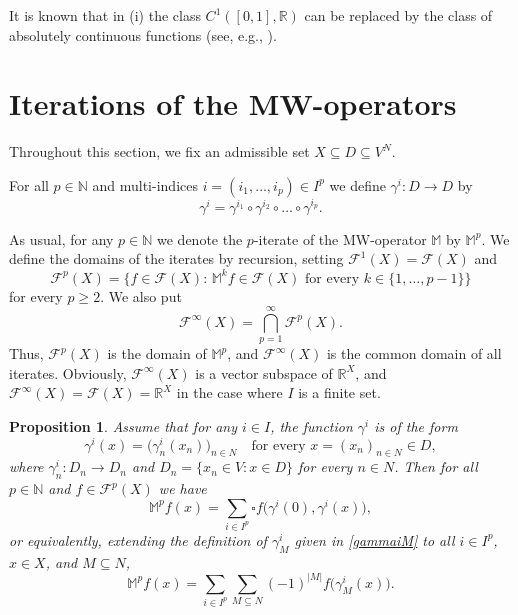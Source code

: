 \documentclass{amsart}
\theoremstyle{plain}%
\newtheorem{proposition}[theorem]{Proposition}
\theoremstyle{definition}
\theoremstyle{remark}
\begin{document}
It is known that in (i) the class $C^1([0,1],\mathbb R)$ can be replaced by the class of absolutely continuous functions (see, e.g., \cite{R57,LP77}).


\section{Iterations of the MW-operators}\label{section8}
Throughout this section, we fix an admissible set $X\subseteq D\subseteq V^N$. 

For all $p\in\mathbb{N}$ and multi-indices $i=(i_1,\ldots,i_p)\in I^p$ we define $\gamma^i\colon D\to D$ by
\begin{equation*}
\gamma^i=\gamma^{i_1}\circ\gamma^{i_2}\circ\dots\circ \gamma^{i_p}.
\end{equation*}

As usual, for any $p\in\mathbb N$ we denote the $p$\nobreakdash-iterate of the MW\nobreakdash-operator $\mathbb{M}$ by $\mathbb{M}^p$. We define the domains of the iterates by recursion, setting $\mathcal{F}^1(X)=\mathcal{F}(X)$ and 
\begin{equation*}
\mathcal{F}^{p}(X)=\big\{f\in \mathcal{F}(X):\,\mathbb{M}^k f\in \mathcal{F}(X) \text{ for every }k\in \{1,\ldots,p-1\}\big\}
\end{equation*} 
for every $p\geq 2$. We also put
\begin{equation*}
\mathcal{F}^\infty(X)=\bigcap_{p=1}^\infty \mathcal{F}^p(X).
\end{equation*}
Thus, $\mathcal{F}^p(X)$ is the domain of $\mathbb M^p$, and $\mathcal{F}^\infty(X)$ is the common domain of all iterates. Obviously, $\mathcal{F}^\infty(X)$ is a vector subspace of $\mathbb{R}^X$, and $\mathcal{F}^\infty(X)=\mathcal{F}(X)=\mathbb{R}^X$ in the case where $I$ is a finite set.

\begin{proposition}\label{prop:IterationsMWoperatorsSpecial}
Assume that for any $i\in I$, the function $\gamma^i$ is of the form
\begin{equation*}
\gamma^i(x)=\big(\gamma^i_n(x_n)\big)_{n\in N}\quad\text{for every }x=(x_n)_{n\in N}\in D,
\end{equation*}	
where $\gamma^i_n\colon D_n\to D_n$ and $D_n=\{x_n\in V:x\in D\}$ for every $n\in N$.
Then for all $p\in\mathbb{N}$ and $f\in \mathcal{F}^p(X)$ we have 
\begin{equation*}\label{equ:mMWoperatorSpecial}
\mathbb{M}^p f(x)=\sum_{i\in I^p}\square f\big(\gamma^i(0),\gamma^i(x)\big),
\end{equation*}
or equivalently, extending the  definition of $\gamma^i_M$ given in \eqref{gammaiM} to all $i \in I^p$, $x \in X$, and $M \subseteq N$, 
\begin{equation}\label{equ:mMWoperatorSpecialDirect}
\mathbb{M}^p f(x)=\sum_{i\in I^p}\sum_{M\subseteq N}(-1)^{|M|}f\big(\gamma^i_M(x)\big).
\end{equation}
\end{proposition}	
\end{document}
